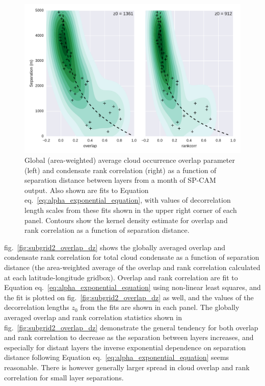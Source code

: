 \begin{figure}[htbp]
\centering
\includegraphics{graphics/subgrid2_overlap_dz.pdf}
\caption{\label{fig:subgrid2_overlap_dz}Global (area-weighted) average
cloud occurrence overlap parameter (left) and condensate rank
correlation (right) as a function of separation distance between layers
from a month of SP-CAM output. Also shown are fits to Equation
eq.~\ref{eq:alpha_exponential_equation}, with values of decorrelation
length scales from these fits shown in the upper right corner of each
panel. Contours show the kernel density estimate for overlap and rank
correlation as a function of separation
distance.}\label{fig:subgrid2ux5foverlapux5fdz}
\end{figure}

fig.~\ref{fig:subgrid2_overlap_dz} shows the globally averaged overlap
and condensate rank correlation for total cloud condensate as a function
of separation distance (the area-weighted average of the overlap and
rank correlation calculated at each latitude-longitude gridbox). Overlap
and rank correlation are fit to Equation
eq.~\ref{eq:alpha_exponential_equation} using non-linear least squares,
and the fit is plotted on fig.~\ref{fig:subgrid2_overlap_dz} as well,
and the values of the decorrelation lengths \(z_0\) from the fits are
shown in each panel. The globally averaged overlap and rank correlation
statistics shown in fig.~\ref{fig:subgrid2_overlap_dz} demonstrate the
general tendency for both overlap and rank correlation to decrease as
the separation between layers increases, and especially for distant
layers the inverse exponential dependence on separation distance
following Equation eq.~\ref{eq:alpha_exponential_equation} seems
reasonable. There is however generally larger spread in cloud overlap
and rank correlation for small layer separations.

